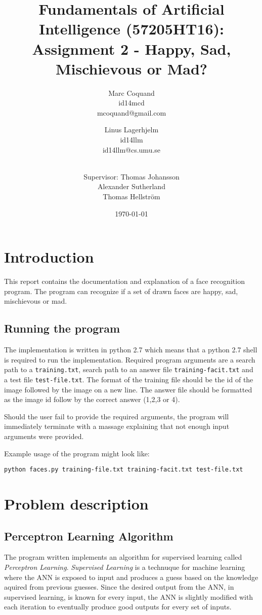 \documentclass[12pt]{article}
\title{Fundamentals of Artificial Intelligence (57205HT16): Assignment 2 -
Happy, Sad, Mischievous or Mad?}
\author{
    Marc Coquand \\ 
    id14mcd \\
    mcoquand@gmail.com \and
		Linus Lagerhjelm \\
		id14llm \\
		id14llm@cs.umu.se \and \\
		Supervisor: Thomas Johansson\\
		Alexander Sutherland \\
		Thomas Hellström
}
\date{\today}
\begin{document}
\maketitle

\newpage
\tableofcontents

\newpage
\section{Introduction}

This report contains the documentation and explanation of a face recognition
program. The program can recognize if a set of drawn faces are happy, sad,
mischievous or mad.


\subsection{Running the program}

The implementation is written in python 2.7 which means that a python 2.7 shell
is required to run the implementation. Required program arguments are a search
path to a \texttt{training.txt}, search path to an answer file
\texttt{training-facit.txt} and a test file \texttt{test-file.txt}. The format
of the training file should be the id of the image followed by the image on a
new line. The answer file should be formatted as the image id follow by the
correct answer (1,2,3 or 4).

Should the user fail to provide the required arguments, the program will
immediately terminate with a massage explaining that not enough input
arguments were provided.

Example usage of the program might look like:
\begin{verbatim}
python faces.py training-file.txt training-facit.txt test-file.txt
\end{verbatim}






\section {Problem description}

\subsection {Perceptron Learning Algorithm}
The program written implements an algorithm for supervised learning called
\textit{Perceptron Learning}. \textit{Supervised Learning} is a technuque
for machine learning where the ANN is exposed to input and produces a guess
based on the knowledge aquired from previous guesses. Since the desired
output from the ANN, in supervised learning, is known for every input, the
ANN is slightly modified with each iteration to eventually produce good
outputs for every set of inputs.
\end{document}
